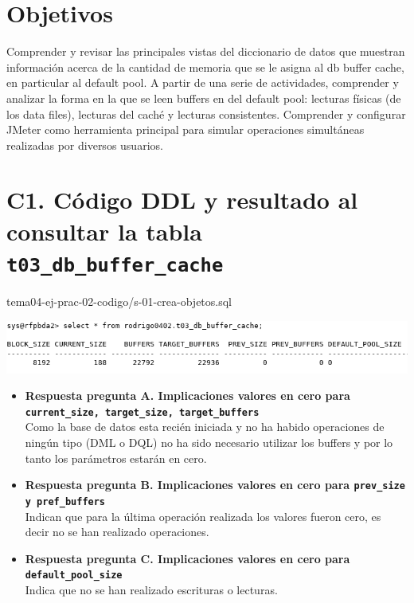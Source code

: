 \documentclass{article}
\begin{document}
\section*{Objetivos}

Comprender y revisar las principales vistas del diccionario de datos que 
muestran información acerca de la cantidad de memoria que se le asigna
al db buffer cache, en particular al default pool. A partir de una serie de 
actividades, comprender y analizar la forma en la que se leen buffers en del
default pool: lecturas físicas (de los data files), lecturas del caché y 
lecturas consistentes.
Comprender y configurar JMeter como herramienta principal
para simular operaciones simultáneas realizadas por diversos usuarios.


\section*{C1. Código DDL y resultado al consultar la tabla
\texttt{t03\_db\_buffer\_cache}}


  {tema04-ej-prac-02-codigo/s-01-crea-objetos.sql}

  \includegraphics[width=0.9\linewidth]{c1}

  \begin{itemize}
    \item \textbf{Respuesta pregunta A. Implicaciones valores en cero para
      \texttt{current\_size, target\_size, target\_buffers}} \\[3mm]
      Como la base de datos esta recién iniciada y no ha habido operaciones 
      de ningún tipo (DML o DQL) no ha sido necesario utilizar los buffers y por 
      lo tanto los parámetros estarán en cero.

    \item \textbf{Respuesta pregunta B. Implicaciones valores en cero para
      \texttt{prev\_size y pref\_buffers}}\\[3mm]
      Indican que para la última operación realizada los valores fueron cero,
      es decir no se han realizado operaciones.

    \item \textbf{Respuesta pregunta C. Implicaciones valores en cero para
      \texttt{default\_pool\_size}}\\[3mm]
      Indica que no se han realizado escrituras o lecturas.
      
  \end{itemize}
\end{document}
